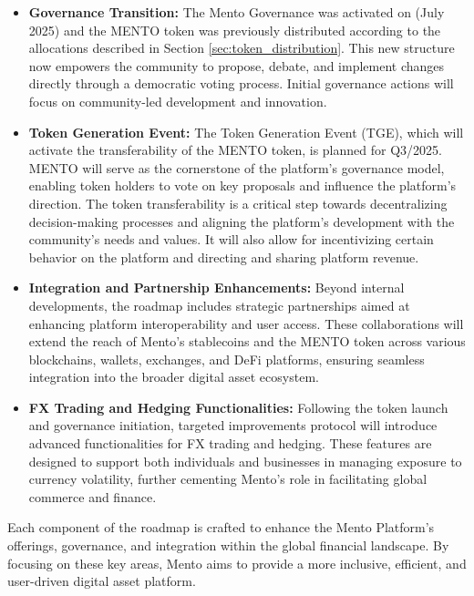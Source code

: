 \documentclass[a4paper]{article}
\theoremstyle{definition}
\begin{document}
\begin{itemize}
    \item \textbf{Governance Transition:}
    The Mento Governance was activated on (July 2025) and the MENTO token was previously distributed according to the allocations described in Section \ref{sec:token_distribution}. This new structure now empowers the community to propose, debate, and implement changes directly through a democratic voting process. Initial governance actions will focus on community-led development and innovation. 

    \item \textbf{Token Generation Event:}
    The Token Generation Event (TGE), which will activate the transferability of the MENTO token, is planned for Q3/2025. MENTO will serve as the cornerstone of the platform's governance model, enabling token holders to vote on key proposals and influence the platform's direction. The token transferability is a critical step towards decentralizing decision-making processes and aligning the platform's development with the community's needs and values. It will also allow for incentivizing certain behavior on the platform and directing and sharing platform revenue.
    
    \item \textbf{Integration and Partnership Enhancements:}
    Beyond internal developments, the roadmap includes strategic partnerships aimed at enhancing platform interoperability and user access. These collaborations will extend the reach of Mento's stablecoins and the MENTO token across various blockchains, wallets, exchanges, and DeFi platforms, ensuring seamless integration into the broader digital asset ecosystem. 
    
    \item \textbf{FX Trading and Hedging Functionalities:}
    Following the token launch and governance initiation, targeted improvements protocol will introduce advanced functionalities for FX trading and hedging. These features are designed to support both individuals and businesses in managing exposure to currency volatility, further cementing Mento's role in facilitating global commerce and finance.

\end{itemize}

Each component of the roadmap is crafted to enhance the Mento Platform's offerings, governance, and integration within the global financial landscape. By focusing on these key areas, Mento aims to provide a more inclusive, efficient, and user-driven digital asset platform.
\end{document}
